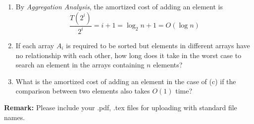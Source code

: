 \documentclass[12pt,a4paper]{article}
\makeatletter
\newtheorem*{solution}{Solution}
\theoremstyle{definition}
\renewenvironment{solution}[1][Solution] {\par\pushQED{\qed}\normalfont\topsep6\p@\@plus6\p@\relax\trivlist\item[\hskip\labelsep\bfseries#1\@addpunct{.}]\ignorespaces}{\popQED\endtrivlist\@endpefalse} \makeatother
\makeatother
\begin{document}
\begin{enumerate}
\begin{enumerate}
\begin{solution}
			By \emph{Aggregation Analysis}, the amortized cost of adding an element is
			\begin{equation*}
				\frac{T(2^i)}{2^i} = i+1 = \log_2 n + 1 = O(\log n)
			\end{equation*}
		\end{solution}
        \item If each array $A_i$ is required to be sorted but elements in different arrays have no relationship with each other, how long does it take in the worst case to search an element in the arrays containing $n$ elements? 
		\item What is the amortized cost of adding an element in the case of (c) if the comparison between two elements also takes $O(1)$ time?
    \end{enumerate}
	
\end{enumerate}



\textbf{Remark:} Please include your .pdf, .tex files for uploading with standard file names.


\end{document}
